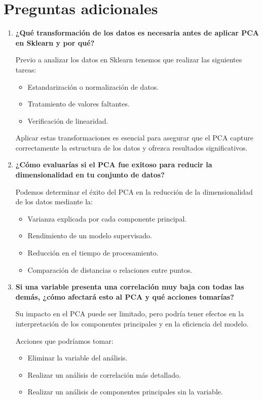 \newpage
\section{Preguntas adicionales}
\begin{enumerate}
    \item \textbf{¿Qué transformación de los datos es necesaria antes de aplicar PCA en Sklearn y por qué?}

    Previo a analizar los datos en Sklearn tenemos que realizar las siguientes tareas:
    \begin{itemize}
        \item Estandarización o normalización de datos.
        \item Tratamiento de valores faltantes.
        \item Verificación de linearidad.
    \end{itemize}

    Aplicar estas transformaciones es esencial para asegurar que el PCA capture correctamente la estructura de
    los datos y ofrezca resultados significativos.

    \item \textbf{¿Cómo evaluarías si el PCA fue exitoso para reducir la dimensionalidad en tu conjunto de datos?}

    Podemos determinar el éxito del PCA en la reducción de la dimensionalidad de los datos mediante la:
    \begin{itemize}
        \item Varianza explicada por cada componente principal.
        \item Rendimiento de un modelo supervisado.
        \item Reducción en el tiempo de procesamiento.
        \item Comparación de distancias o relaciones entre puntos.
    \end{itemize}

    \item \textbf{Si una variable presenta una correlación muy baja con todas las demás, ¿cómo afectará esto al PCA y qué acciones tomarías?}

    Su impacto en el PCA puede ser limitado, pero podría tener efectos en la interpretación de los componentes
    principales y en la eficiencia del modelo.

    Acciones que podríamos tomar:
    \begin{itemize}
        \item Eliminar la variable del análisis.
        \item Realizar un análisis de correlación más detallado.
        \item Realizar un análisis de componentes principales sin la variable.
    \end{itemize}


\end{enumerate}
